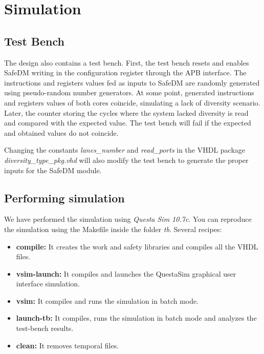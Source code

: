\section{Simulation}

\subsection{Test Bench}

The design also contains a test bench. First, the test bench resets and enables SafeDM writing in the configuration register through the APB interface. The instructions and registers values fed as inputs to SafeDM are randomly generated using pseudo-random number generators. At some point, generated instructions and registers values of both cores coincide, simulating a lack of diversity scenario. Later, the counter storing the cycles where the system lacked diversity is read and compared with the expected value. The test bench will fail if the expected and obtained values do not coincide.

Changing the constants \textit{lanes\_number} and \textit{read\_ports} in the VHDL package \textit{diversity\_type\_pkg.vhd} will also modify the test bench to generate the proper inputs for the SafeDM module.



\subsection{Performing simulation}

We have performed the simulation using \textit{Questa Sim 10.7c}. You can reproduce the simulation using the Makefile inside the folder \textit{tb}. Several recipes:

\begin{itemize}
    \item \textbf{compile:} It creates the work and safety libraries and compiles all the VHDL files.
    \item \textbf{vsim-launch:} It compiles and launches the QuestaSim graphical user interface simulation.
    \item \textbf{vsim:} It compiles and runs the simulation in batch mode.
    \item \textbf{launch-tb:} It compiles, runs the simulation in batch mode and analyzes the test-bench results.
    \item \textbf{clean:} It removes temporal files.                                                         
\end{itemize}




